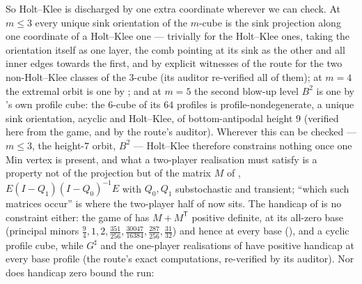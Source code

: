 \documentclass[11pt]{article}
\theoremstyle{plain}
\theoremstyle{definition}
\begin{document}
So Holt--Klee is discharged by one extra coordinate wherever we can
check. At $m\le3$ every unique sink orientation of the $m$-cube is the
sink projection along one coordinate of a Holt--Klee one --- trivially
for the Holt--Klee ones, taking the orientation itself as one layer, the
comb pointing at its sink as the other and all inner edges towards the
first, and by explicit witnesses of the route for the two non-Holt--Klee
classes of the $3$-cube (its auditor re-verified all of them); at $m=4$
the extremal orbit is one by ; and at $m=5$ the
second blow-up level $B^{2}$ is one by 's own
profile cube: the $6$-cube of its $64$ profiles is profile-nondegenerate,
a unique sink orientation, acyclic and Holt--Klee, of bottom-antipodal
height $9$ (verified here from the game, and by the route's auditor). Wherever
this can be checked --- $m\le3$, the height-$7$ orbit, $B^{2}$ ---
Holt--Klee therefore constrains nothing once
one Min vertex is present, and what a two-player realisation must satisfy
is a property not of the projection but of the matrix $M$ of
, $E(I-Q_1)(I-Q_0)^{-1}E$ with $Q_0,Q_1$ substochastic and
transient; ``which such matrices occur'' is where the two-player half of
 now sits. The handicap of  is no
constraint either: the game of  has $M+M^{\mathsf T}$
positive definite, at its all-zero base (principal minors
$\tfrac94,1,2,\tfrac{351}{256},\tfrac{30047}{16384},\tfrac{287}{256},\tfrac{31}{32}$)
and hence at every base (), and a cyclic profile
cube, while $G^{\sharp}$ and the one-player realisations of
 have positive handicap at every base profile
(the route's exact computations, re-verified by its auditor). Nor does
handicap zero bound the run:
\end{document}
